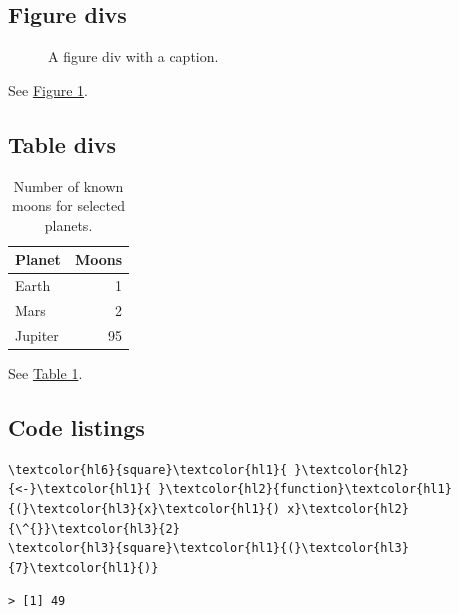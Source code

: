 \documentclass[11pt]{article}
\begin{document}
\subsection{Figure divs}
\label{figure-divs}



\begin{figure}
\centering
{}


\caption{A figure div with a caption.}
\label{fig-div-example}
\end{figure}

See \hyperref[fig-div-example]{Figure 1}.

\subsection{Table divs}
\label{table-divs}



\begin{table}
\centering
\caption{Number of known moons for selected planets.}
\label{tbl-planets}
\begin{tabular}{lr}
\hline
Planet & Moons \\
\hline
Earth & 1 \\
Mars & 2 \\
Jupiter & 95 \\
\hline
\end{tabular}


\end{table}

See \hyperref[tbl-planets]{Table 1}.

\subsection{Code listings}
\label{code-listings}




\begin{srccode}
\begin{Verbatim}[commandchars=\\\{\}]
\textcolor{hl6}{square}\textcolor{hl1}{ }\textcolor{hl2}{<-}\textcolor{hl1}{ }\textcolor{hl2}{function}\textcolor{hl1}{(}\textcolor{hl3}{x}\textcolor{hl1}{) x}\textcolor{hl2}{\^{}}\textcolor{hl3}{2}
\textcolor{hl3}{square}\textcolor{hl1}{(}\textcolor{hl3}{7}\textcolor{hl1}{)}
\end{Verbatim}
\end{srccode}
\label{lst-example}

\begin{outcode}
\begin{verbatim}
> [1] 49
\end{verbatim}
\end{outcode}
\end{document}
